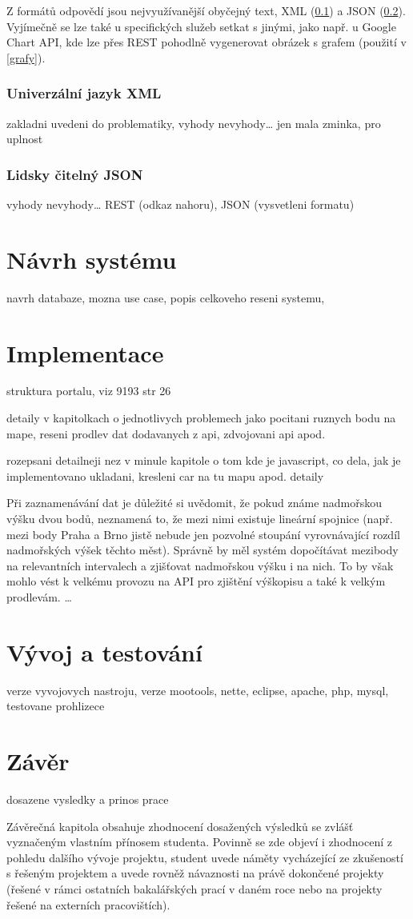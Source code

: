 Z formátů odpovědí jsou nej\-využívanější obyčejný text, XML (\ref{xml})
a JSON (\ref{json}). Vyjímečně se lze také u specifických služeb
setkat s jinými, jako např. u Google Chart API, kde lze přes REST
pohodlně vygenerovat obrázek s grafem (použití v \ref{grafy}).

\subsection{Univerzální jazyk XML}\label{xml}
zakladni uvedeni do problematiky, vyhody nevyhody\ldots
jen mala zminka, pro uplnost
\subsection{Lidsky čitelný JSON}\label{json}
vyhody nevyhody\ldots
REST (odkaz nahoru), JSON (vysvetleni formatu)

\chapter{Návrh systému}
navrh databaze, mozna use case, popis celkoveho reseni systemu,

\chapter{Implementace}
struktura portalu, viz 9193 str 26

detaily v kapitolkach o jednotlivych problemech jako pocitani ruznych bodu na mape, reseni prodlev dat
dodavanych z api, zdvojovani api apod.

rozepsani detailneji nez v minule kapitole o tom kde je javascript,
co dela, jak je implementovano ukladani, kresleni car na tu mapu
apod. detaily

Při zaznamenávání dat je důležité si uvědomit, že pokud známe
nadmořskou výšku dvou bodů, neznamená to, že mezi nimi existuje
lineární spojnice (např. mezi body Praha a Brno jistě nebude jen
pozvolné stoupání vyrovnávající rozdíl nadmořských výšek těchto
měst). Správně by měl systém dopočítávat mezibody na relevantních
intervalech a zjišťovat nadmořskou výšku i na nich. To by však mohlo
vést k velkému provozu na API pro zjištění výškopisu a také k velkým
prodlevám. \ldots

\chapter{Vývoj a testování}
verze vyvojovych nastroju, verze mootools, nette, eclipse, apache,
php, mysql, testovane prohlizece

\chapter*{Závěr}
dosazene vysledky a prinos prace

Závěrečná kapitola obsahuje zhodnocení dosažených výsledků se zvlášť
vyznačeným vlastním přínosem studenta. Povinně se zde objeví i
zhodnocení z pohledu dalšího vývoje projektu, student uvede náměty
vycházející ze zkušeností s řešeným projektem a uvede rovněž
návaznosti na právě dokončené projekty (řešené v rámci ostatních
bakalářských prací v daném roce nebo na projekty řešené na externích
pracovištích).
